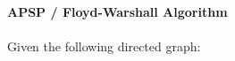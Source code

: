 \textbf{\LARGE{\color{tumgadPurple}APSP / Floyd-Warshall Algorithm}}\\
\\
\noindent
Given the following directed graph:
